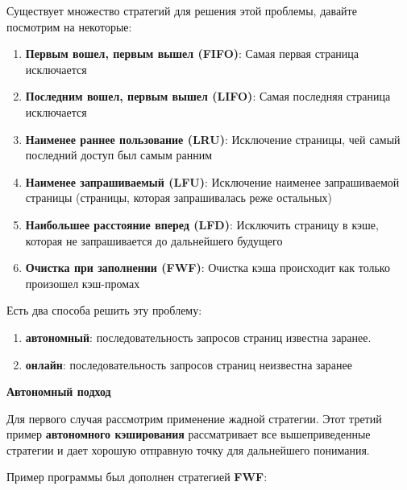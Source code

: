 \vspace{\baselineskip}

Существует множество стратегий для решения этой проблемы, давайте посмотрим на некоторые:

\begin{enumerate}
    \item \textbf{Первым вошел, первым вышел (FIFO)}: Самая первая страница исключается
    \item \textbf{Последним вошел, первым вышел (LIFO)}: Самая последняя страница исключается
    \item \textbf{Наименее раннее пользование (LRU)}: Исключение страницы, чей самый последний доступ был самым ранним
    \item \textbf{Наименее запрашиваемый (LFU)}: Исключение наименее запрашиваемой страницы (страницы, которая запрашивалась реже остальных)
    \item \textbf{Наибольшее расстояние вперед (LFD)}: Исключить страницу в кэше, которая не запрашивается до дальнейшего будущего
    \item \textbf{Очистка при заполнении (FWF)}: Очистка кэша происходит как только произошел кэш-промах
\end{enumerate}

Есть два способа решить эту проблему:

\begin{enumerate}
    \item \textbf{автономный}: последовательность запросов страниц известна заранее.
    \item \textbf{онлайн}: последовательность запросов страниц неизвестна заранее
\end{enumerate}

\textbf{Автономный подход}

\vspace{\baselineskip}

Для первого случая рассмотрим применение жадной стратегии. Этот третий пример \textbf{автономного кэширования} рассматривает все вышеприведенные стратегии и дает хорошую отправную точку для дальнейшего понимания.

\vspace{\baselineskip}

Пример программы был дополнен стратегией \textbf{FWF}:

